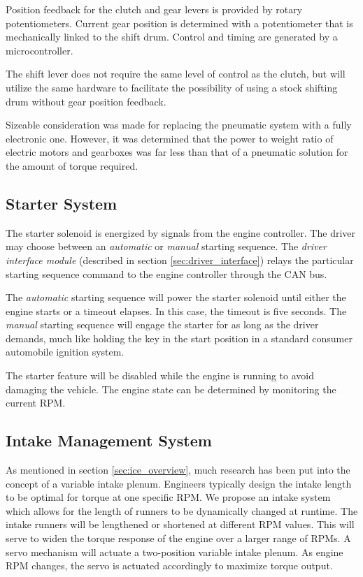 Position feedback for the clutch and gear levers is provided by rotary potentiometers. Current gear position is determined with a potentiometer that is mechanically linked to the shift drum. Control and timing are generated by a microcontroller.

The shift lever does not require the same level of control as the clutch, but will utilize the same hardware to facilitate the possibility of using a stock shifting drum without gear position feedback.

Sizeable consideration was made for replacing the pneumatic system with a fully electronic one. However, it was determined that the power to weight ratio of electric motors and gearboxes was far less than that of a pneumatic solution for the amount of torque required.

\subsection{Starter System}

The starter solenoid is energized by signals from the engine controller. The driver may choose between an \emph{automatic} or \emph{manual} starting sequence. The \emph{driver interface module} (described in section \ref{sec:driver_interface}) relays the particular starting sequence command to the engine controller through the CAN bus.

The \emph{automatic} starting sequence will power the starter solenoid until either the engine starts or a timeout elapses. In this case, the timeout is five seconds. The \emph{manual} starting sequence will engage the starter for as long as the driver demands, much like holding the key in the start position in a standard consumer automobile ignition system. 

The starter feature will be disabled while the engine is running to avoid damaging the vehicle. The engine state can be determined by monitoring the current RPM.

\subsection{Intake Management System}

As mentioned in section \ref{sec:ice_overview}, much research has been put into the concept of a variable intake plenum. Engineers typically design the intake length to be optimal for torque at one specific RPM. We propose an intake system which allows for the length of runners to be dynamically changed at runtime. The intake runners will be lengthened or shortened at different RPM values. This will serve to widen the torque response of the engine over a larger range of RPMs. A servo mechanism will actuate a two-position variable intake plenum. As engine RPM changes, the servo is actuated accordingly to maximize torque output.

